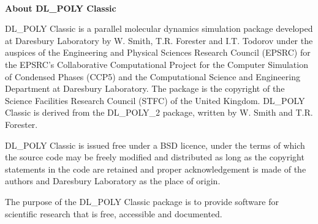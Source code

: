 ~

\vspace{1 in}
\centerline{{\bf About DL\_POLY Classic}}
\vspace{1 in}
DL\_POLY Classic is a parallel molecular dynamics simulation package developed
at Daresbury Laboratory by W. Smith, T.R. Forester and I.T. Todorov under the
auspices of the Engineering and Physical Sciences Research
Council (EPSRC) for the EPSRC's Collaborative Computational Project
for the Computer Simulation of Condensed Phases (CCP5) and the
Computational Science and Engineering Department at Daresbury Laboratory.
The package is the copyright of the Science Facilities Research Council 
(STFC) of the United Kingdom. DL\_POLY Classic is derived from the
DL\_POLY\_2 package, written by W. Smith and T.R. Forester.

DL\_POLY Classic is issued free under a BSD licence, under the terms of which
the source code may be freely modified and distributed as long as the
copyright statements in the code are retained and proper acknowledgement is
made of the authors and Daresbury Laboratory as the place of origin.

The purpose of the DL\_POLY Classic package is to provide software for
scientific research that is free, accessible and documented. 

\clearpage
